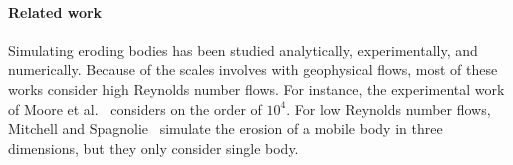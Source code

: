 \documentclass[preprint, 10pt]{elsarticle}
\begin{document}
%

\paragraph{Related work} Simulating eroding bodies has been studied
analytically, experimentally, and numerically.  Because of the scales
involves with geophysical flows, most of these works consider high
Reynolds number flows.  For instance, the experimental work of Moore et
al.~\cite{moo-ris-chi-zha-she2013} considers on the order of $10^4$.
For low Reynolds number flows, Mitchell and Spagnolie~\cite{mit-spa2016}
simulate the erosion of a mobile body in three dimensions, but they only
consider single body.  
\end{document}
